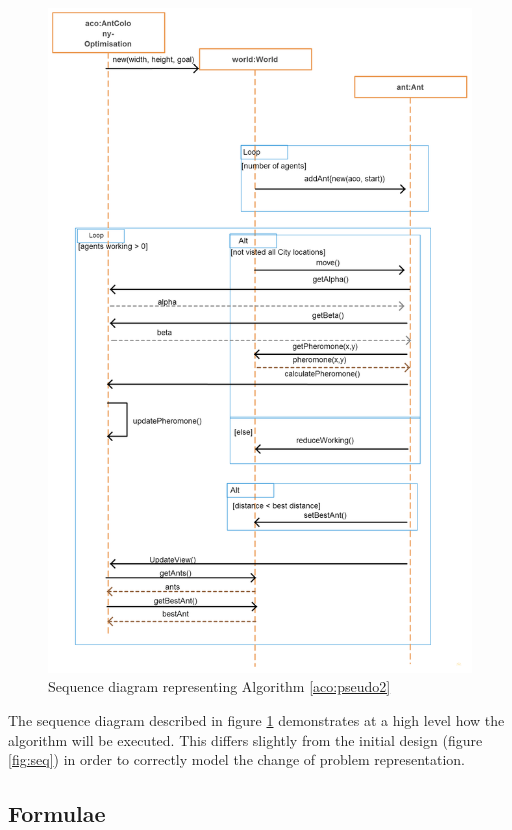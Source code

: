 \begin{figure}[H]
\includegraphics[scale=0.3]{Images/chapter4/sequence}
\caption{Sequence diagram representing Algorithm \ref{aco:pseudo2}}
\label{fig:overSeq}
\end{figure}

The sequence diagram described in figure \ref{fig:overSeq} demonstrates at a high level how the algorithm will be executed. This differs slightly from the initial design (figure \ref{fig:seq}) in order to correctly model the change of problem representation.

\subsection{Formulae}

